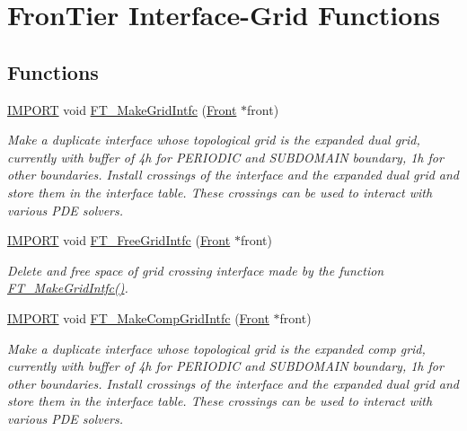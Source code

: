 \hypertarget{group___g_r_i_d_i_n_t_f_c}{}\section{Fron\+Tier Interface-\/\+Grid Functions}
\label{group___g_r_i_d_i_n_t_f_c}
\subsection*{Functions}
\begin{DoxyCompactItemize}
\item 
\hyperlink{cdecs_8h_a773175d74e73776d69c3e538f17de1ee}{I\+M\+P\+O\+RT} void \hyperlink{group___g_r_i_d_i_n_t_f_c_ga2bac4ec588ff38cb9ac1abba111146c9}{F\+T\+\_\+\+Make\+Grid\+Intfc} (\hyperlink{fdecs_8h_ac32202b798f848095c489cfd04c4ca5f}{Front} $\ast$front)
\begin{DoxyCompactList}\small\item\em Make a duplicate interface whose topological grid is the expanded dual grid, currently with buffer of 4h for P\+E\+R\+I\+O\+D\+IC and S\+U\+B\+D\+O\+M\+A\+IN boundary, 1h for other boundaries. Install crossings of the interface and the expanded dual grid and store them in the interface table. These crossings can be used to interact with various P\+DE solvers. \end{DoxyCompactList}\item 
\hyperlink{cdecs_8h_a773175d74e73776d69c3e538f17de1ee}{I\+M\+P\+O\+RT} void \hyperlink{group___g_r_i_d_i_n_t_f_c_ga03dfa34f5478d732b91a297188a6bfb5}{F\+T\+\_\+\+Free\+Grid\+Intfc} (\hyperlink{fdecs_8h_ac32202b798f848095c489cfd04c4ca5f}{Front} $\ast$front)
\begin{DoxyCompactList}\small\item\em Delete and free space of grid crossing interface made by the function \hyperlink{group___g_r_i_d_i_n_t_f_c_ga2bac4ec588ff38cb9ac1abba111146c9}{F\+T\+\_\+\+Make\+Grid\+Intfc()}. \end{DoxyCompactList}\item 
\hyperlink{cdecs_8h_a773175d74e73776d69c3e538f17de1ee}{I\+M\+P\+O\+RT} void \hyperlink{group___g_r_i_d_i_n_t_f_c_ga70d43787e4dee696c039d4286a904c5c}{F\+T\+\_\+\+Make\+Comp\+Grid\+Intfc} (\hyperlink{fdecs_8h_ac32202b798f848095c489cfd04c4ca5f}{Front} $\ast$front)
\begin{DoxyCompactList}\small\item\em Make a duplicate interface whose topological grid is the expanded comp grid, currently with buffer of 4h for P\+E\+R\+I\+O\+D\+IC and S\+U\+B\+D\+O\+M\+A\+IN boundary, 1h for other boundaries. Install crossings of the interface and the expanded dual grid and store them in the interface table. These crossings can be used to interact with various P\+DE solvers. \end{DoxyCompactList}\item 

\end{DoxyCompactItemize}
